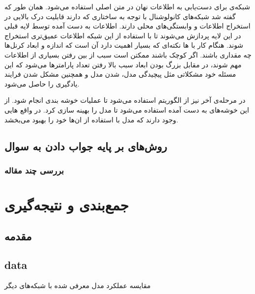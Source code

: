 \documentclass[12pt, a4paper, oneside]{report}
\begin{document}
شبکه‌ی
برای دست‌یابی به اطلاعات نهان در متن اصلی استفاده می‌شود. همان طور که گفته شد شبکه‌های کانولوشنال
با توجه به ساختاری که دارند قابلیت درک بالایی در استخراج اطلاعات و وابستگی‌های محلی دارند. اطلاعات به دست آمده
توسط لایه قبلی در این لایه پردازش می‌شوند تا با استفاده از این شبکه اطلاعات عمیق‌تری استخراج شوند.
هنگام کار با
ها نکته‌ای که بسیار اهمیت دارد آن است که اندازه و ابعاد کرنل‌ها چه مقداری باشند. اگر کوچک باشند ممکتن است
سبب از بین رفتن بسیاری از اطلاعات مهم شوند، در مقابل بزرگ بودن ابعاد سبب بالا رفتن تعداد پارامتر‌ها می‌شود که این
مسئله خود مشکلاتی مثل پیچیدگی مدل،
شدن مدل و همچنین مشکل شدن فرایند یادگیری را حاصل می‌شود.

در مرحله‌ی آخر نیز از الگوریتم
استفاده می‌شود تا عملیات خوشه بندی انجام شود. از این خوشه‌های به دست آمده استفاده می‌شود تا مدل را بهینه سازی کرد.
در واقع
هایی وجود دارند که مدل با استفاده از ان‌ها خود را بهبود می‌بخشد.

\section{روش‌های بر پایه جواب دادن به سوال}

\subsection{بررسی چند مقاله}

\chapter{جمع‌بندی و نتیجه‌گیری}
\pagebreak
\section{مقدمه}

\section{data}

\begin{table}[!ht]
\begin{tiny}
\begin{center}
   
    \caption{مقایسه عملکرد مدل معرفی شده با شبکه‌های دیگر}
    \label{tab:aaaa}
\end{center}
\end{tiny}
\end{table}


\begin{latin}
    
\end{latin}
\end{document}
